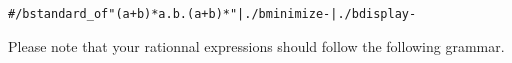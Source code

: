 \begin{alltt}
# /b standard_of "(a+b)*a.b.(a+b)*" | ./b minimize - | ./b display -
\end{alltt}
\begin{center}
\end{center}
Please note that your rationnal expressions should follow the
following grammar. %

